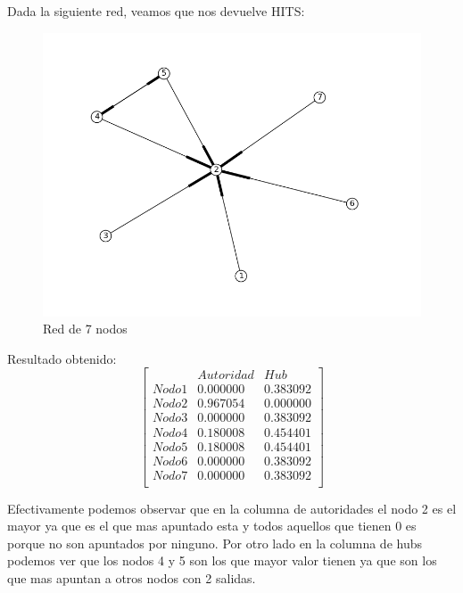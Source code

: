 Dada la siguiente red, veamos que nos devuelve HITS:

 \begin{figure}[!htb]
\begin{center}
    \includegraphics[scale=0.5]{imagenes/test4.png}
    \caption{Red de 7 nodos}
    \end{center}
\end{figure}

Resultado obtenido:
   $$ 
\begin{bmatrix}
              &    Autoridad  &  Hub \\
 Nodo 1 &   0.000000    &      0.383092       \\
 Nodo 2   &  0.967054    &  0.000000     \\
 Nodo 3   &  0.000000   &     0.383092  \\
 Nodo 4   &  0.180008    &     0.454401       \\
 Nodo 5   &  0.180008    &     0.454401        \\
 Nodo 6   &  0.000000    &      0.383092     \\
 Nodo 7   &  0.000000   &     0.383092 \\
\end{bmatrix} 
$$

Efectivamente podemos observar que en la columna de autoridades el nodo 2 es el mayor ya que es el que mas apuntado esta y todos aquellos que tienen 0 es porque no son apuntados por ninguno. Por otro lado en la columna de hubs podemos ver que los nodos 4 y 5 son los que mayor valor tienen ya que son los que mas apuntan a otros nodos con 2 salidas.

